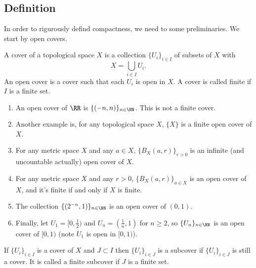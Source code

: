\subsection{Definition}
In order to rigurously defind compactness, we need to some preliminaries. We
start by open covers.
\begin{definition}[Cover]
  A cover of a topological space $X$ is a collection $\{U_i\}_{i\in I}$ of
  subsets of $X$ with 
  \[X=\bigcup_{i\in I} U_i.\]
  An open cover is a cover such that each $U_i$ is open in $X$.
  A cover is called finite if $I$ is a finite set.
  \label{def:cover}
\end{definition}
\begin{example}
  \begin{enumerate}
    \item An open cover of $\RR$ is $\{(-n,n)\}_{n\in\NN}$. This is not a finite cover.
    \item Another example is, for any topological space $X$, $\{X\}$ is a finite
      open cover of $X$.
    \item For any metric space $X$ and any $a\in X$, $\{B_X(a,r)\}_{r>0}$ is an
      infinite (and uncountable actually) open cover of $X$.
    \item For any metric space $X$ and any $r>0$, $\{B_X(a,r)\}_{a\in X}$ is an
      open cover of $X$, and it's finite if and only if $X$ is finite.
    \item The collection $\{(2^{-n},1)\}_{n\in\NN}$ is an open cover of $(0,1)$.
    \item Finally, let $U_1= [0,\frac{1}{2})$ and $U_n = (\frac{1}{n},1)$ for
      $n\geq 2$, so $\{U_n\}_{n\in\NN}$ is an open cover of $[0,1)$ (note $U_1$
      is open in $[0,1)$).
  \end{enumerate}
\end{example}
\begin{definition}
  If $\{U_i\}_{i\in I}$ is a cover of $X$ and $J\subset I$ then
  $\{U_i\}_{i\in J}$ is a subcover if $\{U_i\}_{i\in J}$ is still a cover. It is
  called a finite subcover if $J$ is a finite set.
  \label{def:subcover}
\end{definition}
